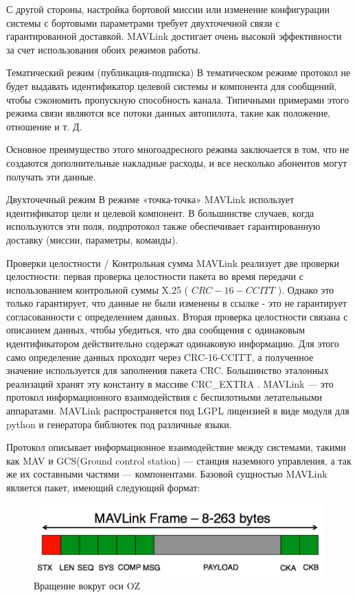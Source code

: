 С другой стороны, настройка бортовой миссии или изменение конфигурации системы с бортовыми параметрами требует двухточечной связи с гарантированной доставкой. MAVLink достигает очень высокой эффективности за счет использования обоих режимов работы.

Тематический режим (публикация-подписка)
В тематическом режиме протокол не будет выдавать идентификатор целевой системы и компонента для сообщений, чтобы сэкономить пропускную способность канала. Типичными примерами этого режима связи являются все потоки данных автопилота, такие как положение, отношение и т. Д.

Основное преимущество этого многоадресного режима заключается в том, что не создаются дополнительные накладные расходы, и все несколько абонентов могут получать эти данные.

Двухточечный режим
В режиме «точка-точка» MAVLink использует идентификатор цели и целевой компонент. В большинстве случаев, когда используются эти поля, подпротокол также обеспечивает гарантированную доставку (миссии, параметры, команды).

Проверки целостности / Контрольная сумма
MAVLink реализует две проверки целостности: первая проверка целостности пакета во время передачи с использованием контрольной суммы X.25 ( $CRC-16-CCITT$ ). Однако это только гарантирует, что данные не были изменены в ссылке - это не гарантирует согласованности с определением данных. Вторая проверка целостности связана с описанием данных, чтобы убедиться, что два сообщения с одинаковым идентификатором действительно содержат одинаковую информацию. Для этого само определение данных проходит через CRC-16-CCITT, а полученное значение используется для заполнения пакета CRC. Большинство эталонных реализаций хранят эту константу в массиве CRC\_EXTRA .
%
MAVLink — это протокол информационного взаимодействия с беспилотными летательными аппаратами. MAVLink распространяется под LGPL лицензией в виде модуля для python и генератора библиотек под различные языки. 

Протокол описывает информационное взаимодействие между системами, такими как MAV и GCS(Ground control station) — станция наземного управления, а так же их составными частями — компонентами. Базовой сущностью MAVLink является пакет, имеющий следующий формат:

\begin{figure}[H]
	\centering
	\includegraphics[width=0.5\linewidth]{pics/mavlink}
	\caption{Вращение вокруг оси OZ
	}
	\label{fig:mavlink}
\end{figure}

